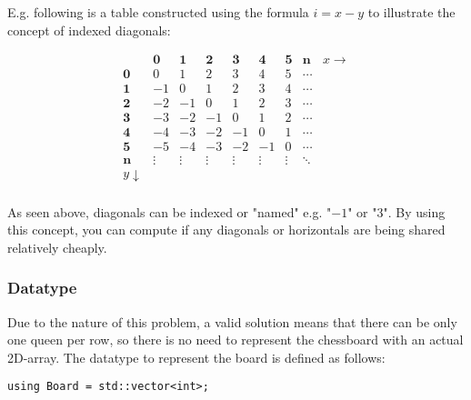 \documentclass{article}
\begin{document}
E.g. following is a table constructed using the formula $i = x-y$ to illustrate the concept of indexed diagonals:

\[
    \begin{array}{c|cccccccc}
                   & \mathbf{0} & \mathbf{1} & \mathbf{2} & \mathbf{3} & \mathbf{4} & \mathbf{5} & \mathbf{n} & x \rightarrow \\
        \hline
        \mathbf{0} & 0          & 1          & 2          & 3          & 4          & 5          & \cdots                     \\
        \mathbf{1} & -1         & 0          & 1          & 2          & 3          & 4          & \cdots                     \\
        \mathbf{2} & -2         & -1         & 0          & 1          & 2          & 3          & \cdots                     \\
        \mathbf{3} & -3         & -2         & -1         & 0          & 1          & 2          & \cdots                     \\
        \mathbf{4} & -4         & -3         & -2         & -1         & 0          & 1          & \cdots                     \\
        \mathbf{5} & -5         & -4         & -3         & -2         & -1         & 0          & \cdots                     \\
        \mathbf{n} & \vdots     & \vdots     & \vdots     & \vdots     & \vdots     & \vdots     & \ddots                     \\
        y \downarrow                                                                                                          \\
    \end{array}
\]


As seen above, diagonals can be indexed or "named" e.g. "$-1$" or "$3$".
By using this concept, you can compute if any diagonals or horizontals are being shared relatively cheaply.

\subsubsection{Datatype}
Due to the nature of this problem, a valid solution means that there can be only one queen per row, so there is no need to represent the chessboard with an actual 2D-array.
The datatype to represent the board is defined as follows:

\begin{lstlisting}
using Board = std::vector<int>;
\end{lstlisting}
\end{document}

